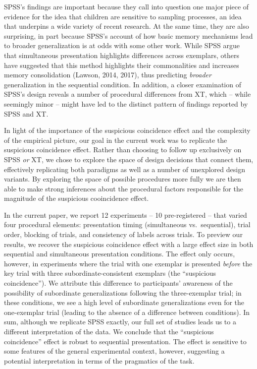 \documentclass[english,floatsintext,man]{apa6}
\theoremstyle{definition}
\theoremstyle{definition}
\theoremstyle{remark}
\begin{document}
SPSS's findings are important because they call into question one major
piece of evidence for the idea that children are sensitive to sampling
processes, an idea that underpins a wide variety of recent research. At
the same time, they are also surprising, in part because SPSS's account
of how basic memory mechanisms lead to broader generalization is at odds
with some other work. While SPSS argue that simultaneous presentation
highlights differences across exemplars, others have suggested that this
method highlights their commonalities and increases memory consolidation
(Lawson, 2014, 2017), thus predicting \emph{broader} generalization in
the sequential condition. In addition, a closer examination of SPSS's
design reveals a number of procedural differences from XT, which --
while seemingly minor -- might have led to the distinct pattern of
findings reported by SPSS and XT.

In light of the importance of the suspicious coincidence effect and the
complexity of the empirical picture, our goal in the current work was to
replicate the suspicious coincidence effect. Rather than choosing to
follow up exclusively on SPSS \emph{or} XT, we chose to explore the
space of design decisions that connect them, effectively replicating
both paradigms as well as a number of unexplored design variants. By
exploring the space of possible procedures more fully we are then able
to make strong inferences about the procedural factors responsible for
the magnitude of the suspicious cooincidence effect.

In the current paper, we report 12 experiments -- 10 pre-registered --
that varied four procedural elements: presentation timing (simultaneous
vs.~sequential), trial order, blocking of trials, and consistency of
labels across trials. To preview our results, we recover the suspicious
coincidence effect with a large effect size in both sequential and
simultaneous presentation conditions. The effect only occurs, however,
in experiments where the trial with one exemplar is presented
\emph{before} the key trial with three subordinate-consistent exemplars
(the \enquote{suspicious coincidence}). We attribute this difference to
participants' awareness of the possibility of subordinate
generalizations following the three-exemplar trial; in these conditions,
we see a high level of subordinate generalizations even for the
one-exemplar trial (leading to the absence of a difference between
conditions). In sum, although we replicate SPSS exactly, our full set of
studies leads us to a different interpretation of the data. We conclude
that the \enquote{suspicious coincidence} effect is robust to sequential
presentation. The effect is sensitive to some features of the general
experimental context, however, suggesting a potential interpretation in
terms of the pragmatics of the task.
\end{document}
